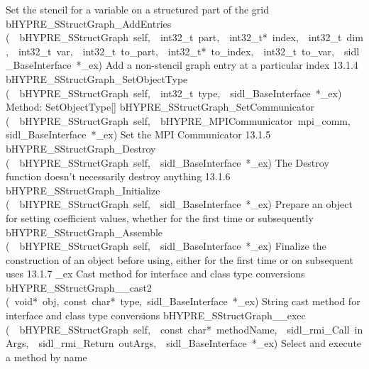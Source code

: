 \documentclass{article}
\begin{document}
\begin{cxxentry}
\begin{cxxentry}
\begin{cxxnames}
        {
Set the stencil for a variable on a structured part of the
grid}
        {}
\label{cxx.13.1.13}
        {bHYPRE\_SStructGraph\_AddEntries}
        {(\ \ bHYPRE\_SStructGraph\ self,\ \ int32\_t\ part,\ \ int32\_t*\ index,\ \ int32\_t\ dim,\ \ int32\_t\ var,\ \ int32\_t\ to\_part,\ \ int32\_t*\ to\_index,\ \ int32\_t\ to\_var,\ \ sidl\_BaseInterface\ *\_ex)}
        {
Add a non-stencil graph entry at a particular index}
        {13.1.4}
        {bHYPRE\_SStructGraph\_SetObjectType}
        {(\ \ bHYPRE\_SStructGraph\ self,\ \ int32\_t\ type,\ \ sidl\_BaseInterface\ *\_ex)}
        {
Method:  SetObjectType[]}
        {}
\label{cxx.13.1.14}
        {bHYPRE\_SStructGraph\_SetCommunicator}
        {(\ \ bHYPRE\_SStructGraph\ self,\ \ bHYPRE\_MPICommunicator\ mpi\_comm,\ \ sidl\_BaseInterface\ *\_ex)}
        {
Set the MPI Communicator}
        {13.1.5}
        {bHYPRE\_SStructGraph\_Destroy}
        {(\ \ bHYPRE\_SStructGraph\ self,\ \ sidl\_BaseInterface\ *\_ex)}
        {
The Destroy function doesn't necessarily destroy anything}
        {13.1.6}
        {bHYPRE\_SStructGraph\_Initialize}
        {(\ \ bHYPRE\_SStructGraph\ self,\ \ sidl\_BaseInterface\ *\_ex)}
        {
Prepare an object for setting coefficient values, whether for
the first time or subsequently}
        {}
\label{cxx.13.1.15}
        {bHYPRE\_SStructGraph\_Assemble}
        {(\ \ bHYPRE\_SStructGraph\ self,\ \ sidl\_BaseInterface\ *\_ex)}
        {
Finalize the construction of an object before using, either
for the first time or on subsequent uses}
        {13.1.7}
        {\_ex}
        {}
        {
Cast method for interface and class type conversions}
        {}
\label{cxx.13.1.16}
        {bHYPRE\_SStructGraph\_\_cast2}
        {(\ void*\ obj,\ const\ char*\ type,\ sidl\_BaseInterface\ *\_ex)}
        {
String cast method for interface and class type conversions}
        {}
\label{cxx.13.1.17}
        {bHYPRE\_SStructGraph\_\_exec}
        {(\ \ bHYPRE\_SStructGraph\ self,\ \ const\ char*\ methodName,\ \ sidl\_rmi\_Call\ inArgs,\ \ sidl\_rmi\_Return\ outArgs,\ \ sidl\_BaseInterface\ *\_ex)}
        {
Select and execute a method by name}
        {}
\label{cxx.13.1.18}

\end{cxxnames}
\end{cxxentry}
\end{cxxentry}
\end{document}
